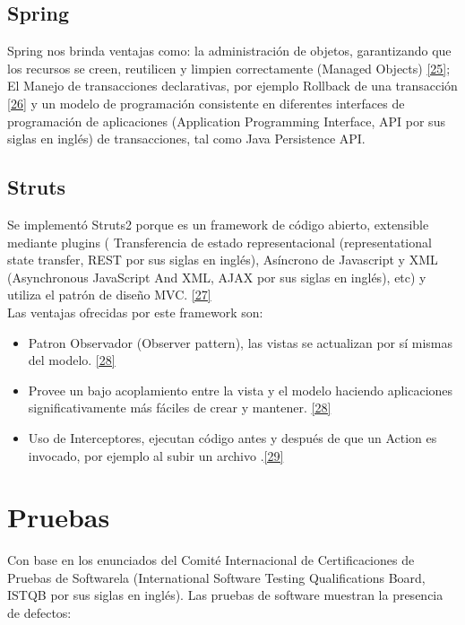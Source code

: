 \subsection {Spring}
Spring nos brinda ventajas como: la administración de objetos, garantizando que los recursos se creen, reutilicen y limpien correctamente (Managed Objects) \hyperlink{b25}{[25]}; El Manejo de transacciones declarativas, por ejemplo Rollback de una transacción \hyperlink{b26}{[26]} y un modelo de programación consistente en diferentes interfaces de programación de aplicaciones (Application Programming Interface, API por sus siglas en inglés) de transacciones, tal como Java Persistence API.

\subsection {Struts}
Se implementó Struts2 porque es un framework de código abierto, extensible mediante plugins ( Transferencia de estado representacional (representational state transfer, REST por sus siglas en inglés), Asíncrono de Javascript y XML (Asynchronous JavaScript And XML, AJAX por sus siglas en inglés), etc) y utiliza el patrón de diseño MVC. \hyperlink{b27}{[27]} \\ 

Las ventajas ofrecidas por este framework son: 

\begin{itemize}
	\item Patron Observador (Observer pattern), las vistas se actualizan por sí mismas del modelo. \hyperlink{b28}{[28]}
	\item Provee un bajo acoplamiento entre la vista y el modelo haciendo aplicaciones significativamente más fáciles de crear y mantener. \hyperlink{b28}{[28]}
	\item Uso de Interceptores, ejecutan código antes y después de que un Action es invocado, por ejemplo al subir un archivo .\hyperlink{b29}{[29]}
\end{itemize}


\section{Pruebas}

Con base en los enunciados del Comité Internacional de Certificaciones de Pruebas de Softwarela (International Software Testing Qualifications Board, ISTQB por sus siglas en inglés). Las pruebas de software muestran la presencia de defectos:\\

